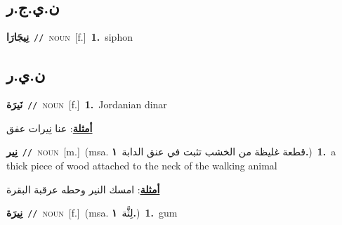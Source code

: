 \documentclass[10pt,a4paper,twoside]{article} %
\begin{document}
\begin{multicols}{2}
\vspace{-3mm}
\subsection*{\color{blue}\foreignlanguage{arabic}{ن.ي.ج.ر}\color{blue}{ (ntws)}} 

{\setlength\topsep{0pt}\textbf{\foreignlanguage{arabic}{نِيجَارَا}}\ {\color{gray}\texttt{//}\color{black}}\ \textsc{noun}\ [f.]\ \textbf{1.}~siphon\ } \vspace{2mm}

\vspace{-3mm}
\subsection*{\color{blue}\foreignlanguage{arabic}{ن.ي.ر}\color{blue}{}} 

{\setlength\topsep{0pt}\textbf{\foreignlanguage{arabic}{نَيرَة}}\ {\color{gray}\texttt{//}\color{black}}\ \textsc{noun}\ [f.]\ \textbf{1.}~Jordanian dinar\  \begin{flushright}\color{gray}\foreignlanguage{arabic}{\textbf{\underline{\foreignlanguage{arabic}{أمثلة}}}: عنا نِيرات عفق}\end{flushright}\color{black}} \vspace{2mm}

{\setlength\topsep{0pt}\textbf{\foreignlanguage{arabic}{نِير}}\ {\color{gray}\texttt{//}\color{black}}\ \textsc{noun}\ [m.]\ \color{gray}(msa. \foreignlanguage{arabic}{قطعة غليظة من الخشب تثبت في عنق الدابة}~\foreignlanguage{arabic}{\textbf{١.}})\color{black}\ \textbf{1.}~a thick piece of wood attached to the neck of the walking animal\  \begin{flushright}\color{gray}\foreignlanguage{arabic}{\textbf{\underline{\foreignlanguage{arabic}{أمثلة}}}: امسك النير وحطه عرقبة البقرة}\end{flushright}\color{black}} \vspace{2mm}

{\setlength\topsep{0pt}\textbf{\foreignlanguage{arabic}{نِيرَة}}\ {\color{gray}\texttt{//}\color{black}}\ \textsc{noun}\ [f.]\ \color{gray}(msa. \foreignlanguage{arabic}{لِثَّة}~\foreignlanguage{arabic}{\textbf{١.}})\color{black}\ \textbf{1.}~gum\ } \vspace{2mm}


\end{multicols}
\end{document}
